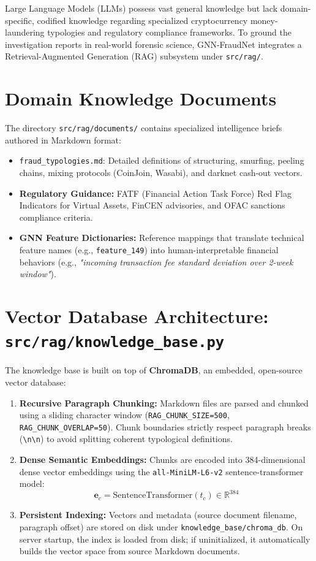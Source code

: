 \documentclass[11pt,a4paper]{report}
\begin{document}
Large Language Models (LLMs) possess vast general knowledge but lack domain-specific, codified knowledge regarding specialized cryptocurrency money-laundering typologies and regulatory compliance frameworks. To ground the investigation reports in real-world forensic science, GNN-FraudNet integrates a Retrieval-Augmented Generation (RAG) subsystem under \texttt{src/rag/}.

\section{Domain Knowledge Documents}
The directory \texttt{src/rag/documents/} contains specialized intelligence briefs authored in Markdown format:
\begin{itemize}[leftmargin=1.5em]
  \item \texttt{fraud\_typologies.md}: Detailed definitions of structuring, smurfing, peeling chains, mixing protocols (CoinJoin, Wasabi), and darknet cash-out vectors.
  \item \textbf{Regulatory Guidance:} FATF (Financial Action Task Force) Red Flag Indicators for Virtual Assets, FinCEN advisories, and OFAC sanctions compliance criteria.
  \item \textbf{GNN Feature Dictionaries:} Reference mappings that translate technical feature names (e.g., \texttt{feature\_149}) into human-interpretable financial behaviors (e.g., \textit{"incoming transaction fee standard deviation over 2-week window"}).
\end{itemize}

\section{Vector Database Architecture: \texttt{src/rag/knowledge\_base.py}}
The knowledge base is built on top of \textbf{ChromaDB}, an embedded, open-source vector database:
\begin{enumerate}[leftmargin=1.5em]
  \item \textbf{Recursive Paragraph Chunking:} Markdown files are parsed and chunked using a sliding character window (\texttt{RAG\_CHUNK\_SIZE=500}, \texttt{RAG\_CHUNK\_OVERLAP=50}). Chunk boundaries strictly respect paragraph breaks (\texttt{\textbackslash n\textbackslash n}) to avoid splitting coherent typological definitions.
  \item \textbf{Dense Semantic Embeddings:} Chunks are encoded into 384-dimensional dense vector embeddings using the \texttt{all-MiniLM-L6-v2} sentence-transformer model:
  \[
  \mathbf{e}_c = \text{SentenceTransformer}(t_c) \in \mathbb{R}^{384}
  \]
  \item \textbf{Persistent Indexing:} Vectors and metadata (source document filename, paragraph offset) are stored on disk under \texttt{knowledge\_base/chroma\_db}. On server startup, the index is loaded from disk; if uninitialized, it automatically builds the vector space from source Markdown documents.
\end{enumerate}
\end{document}
